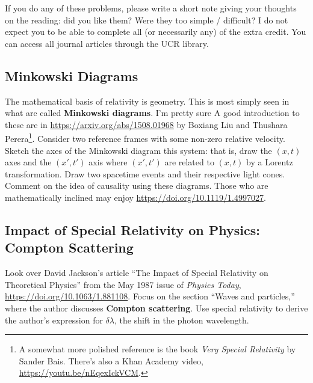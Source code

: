 \documentclass[12pt]{article}
\numberwithin{equation}{section}    %
\begin{document}
If you do any of these problems, please write a short note giving your thoughts on the reading: did you like them? Were they too simple / difficult? I do not expect you to be able to complete all (or necessarily any) of the extra credit. You can access all journal articles through the UCR library.



\subsection{Minkowski Diagrams}

The mathematical basis of relativity is geometry. This is most simply seen in what are called \textbf{Minkowski diagrams}. I'm pretty sure  A good introduction to these are in \url{https://arxiv.org/abs/1508.01968} by Boxiang Liu and Thushara Perera\footnote{A somewhat more polished reference is the book \emph{Very Special Relativity} by Sander Bais. There's also a Khan Academy video, \url{https://youtu.be/nEqexIckVCM}.}. Consider two reference frames with some non-zero relative velocity. Sketch the axes of the Minkowski diagram this system: that is, draw the $(x,t)$ axes and the $(x',t')$ axis where $(x',t')$ are related to $(x,t)$ by a Lorentz transformation.  Draw two spacetime events and their respective light cones. Comment on the idea of causality using these diagrams. Those who are mathematically inclined may enjoy \url{https://doi.org/10.1119/1.4997027}. 

\subsection{Impact of Special Relativity on Physics: Compton Scattering}

Look over David Jackson's article ``The Impact of Special Relativity on Theoretical Physics'' from the May 1987 issue of \emph{Physics Today}, \url{https://doi.org/10.1063/1.881108}. Focus on the section ``Waves and particles,'' where the author discusses \textbf{Compton scattering}.  Use special relativity to derive the author's expression for $\delta\lambda$, the shift in the photon wavelength.
\end{document}

